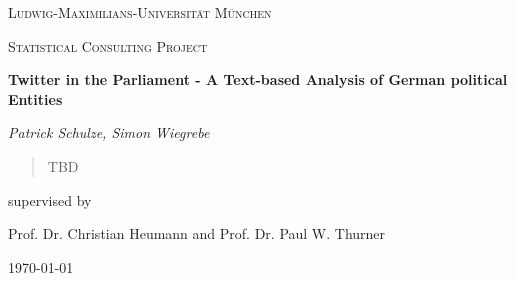 \documentclass[12pt]{article}
\begin{document}
\begin{titlepage}
	\centering
	{\scshape\LARGE Ludwig-Maximilians-Universit\"at M\"unchen \par}
	\vspace{1cm}
	{\scshape\Large Statistical Consulting Project \par}
	\vspace{1.5cm}
	{\huge\bfseries Twitter in the Parliament - A Text-based Analysis of German political Entities  \par}
	\vspace{2cm}
	{\Large\itshape Patrick Schulze, Simon Wiegrebe \par}
	\vspace{2cm}	
	\begin{abstract}
		\begin{center}
		TBD
		\end{center}		
	\end{abstract}
	\vfill
	supervised by\par
	Prof. Dr. Christian Heumann and Prof. Dr. Paul W. Thurner

	\vfill

	{\large \today\par}
\end{titlepage}

\tableofcontents









\newpage


\clearpage



\end{document}
